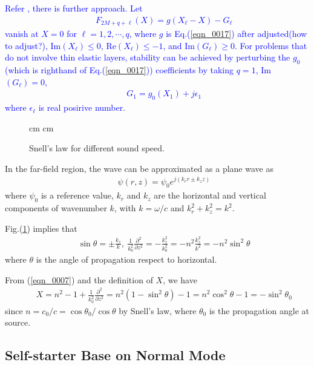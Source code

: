 \documentclass[journal,onecolumn]{IEEEtran}
\begin{document}
\textcolor{blue}{
Refer \cite{MDC_HOPA}, there is further approach. Let
\begin{eqnarray}
&&F_{2M + q + \ell}(X) = g(X_\ell - X) - G_\ell
\label{eqn_00191} 
\end{eqnarray}
vanish at $X = 0$ for $\ell = 1, 2, \cdots, q$, where $g$ is Eq.(\ref{eqn_0017}) after adjusted(how to adjust?), Im$(X_\ell) \leq 0$, Re$(X_\ell) \leq -1$, and Im$(G_\ell) \geq 0$. 
For problems that do not involve thin elastic layers, stability can be achieved by perturbing the $g_0$(which is righthand of Eq.(\ref{eqn_0017})) coefficients by taking $q = 1$, Im$(G_\ell) = 0$,
\begin{eqnarray}
&&G_1 = g_0(X_1) + j \epsilon_1
\label{eqn_00192}
\end{eqnarray}   
where $\epsilon_\ell$ is real posirive number.
}

\begin{figure}[h]
 cm
 cm
\caption{Snell's law for different sound speed.}
\label{Fig_pic1}
\end{figure}

In the far-field region, the wave can be approximated as a plane wave as \cite{COA}
\begin{eqnarray}
&&\psi (r, z) = \psi_0 e^{j(k_r r \pm k_z z)} 
\label{eqn_0020}
\end{eqnarray}
where $\psi_0$ is a reference value, $k_r$ and $k_z$ are the horizontal and vertical components of wavenumber 
$k$, with $k = \omega / c$ and $k_r^2 + k_z^2 = k^2$.

Fig.(\ref{Fig_pic1}) implies that
\begin{eqnarray}
&&\sin \theta = \pm \frac{k_z}{k}, \ \frac{1}{k_0^2} \frac{\partial^2}{\partial z^2} 
= -\frac{k_z^2}{k_0^2} =  - n^2 \frac{k_z^2}{k^2} = - n^2 \sin^2 \theta
\label{eqn_0021} 
\end{eqnarray}
where $\theta$ is the angle of propagation respect to horizontal.

From (\ref{eqn_0007}) and the definition of $X$, we have
\begin{eqnarray}
&&X =  n^2 - 1 + \frac{1}{k_0^2} \frac{\partial^2}{\partial z^2} 
= n^2 ( 1 - \sin^2 \theta ) - 1 = n^2 \cos^2 \theta - 1 = - \sin^2 \theta_0
\label{eqn_0022}
\end{eqnarray}
since $n = c_0 / c = \cos \theta_0 / \cos \theta$ by Snell's law, where $\theta_0$ is the propagation angle at source. 

\subsection{Self-starter Base on Normal Mode}
\end{document}
